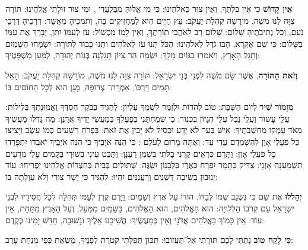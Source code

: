 \textbf{אֵין קָדוֹשׁ}  כִּי אֵין בִּלְתֶּךָ, וְאֵין צוּר כֵּאלֹהֵינוּ: כִּי מִי אֱלוֹהַּ מִבַּלְעֲדֵי \Shem{}, וּמִי צוּר זוּלָתִי אֱלֹהֵינוּ: תּוֹרָה צִוָּה לָנוּ מֹשֶׁה, מוֹרָשָׁה קְהִלַּת יַעֲקֹב: עֵץ חַיִּים הִיא לַמַּחֲזִיקִים בָּהּ, וְתֹמכֶיהָ מְאֻשָּׁר: דְּרָכֶיהָ דַרְכֵי נֹעַם, וְכל נְתִיבֹתֶיהָ שָׁלוֹם: שָׁלוֹם רָב לְאֹהֲבֵי תוֹרָתֶךָ, וְאֵין לָמוֹ מִכְשׁוֹל: \Shem{} עֹז לְעַמּוֹ יִתֵּן, \Shem{} יְבָרֵךְ אֶת עַמּוֹ בַשָּׁלוֹם: כִּי שֵׁם \Shem{} אֶקְרָא, הָבו גֹדֶל לֵאלֹהֵינוּ: הַכֹּל תְּנוּ עֹז לֵאלֹהִים וּתְנוּ כָבוֹד לַתּוֹרָה: יִשְׂמְחוּ הַשָּׁמַיִם וְתָגֵל הָאָרֶץ, וְיֹאמרוּ בַגּוֹיִם \Shem{} מָלָךְ: יִשְׂמַח הַר צִיּוֹן תָּגֵלְנָה בְּנוֹת יְהוּדָה, לְמַעַן מִשְׁפָּטֶיךָ:

\textbf{וְזֹאת הַתּוֹרָה}, אֲשֶׁר שָׂם מֹשֶׁה לִפְנֵי בְּנֵי יִשְׂרָאֵל: תּוֹרָה צִוָּה לָנוּ מֹשֶׁה, מוֹרָשָׁה קְהִלַּת יַעֲקֹב: הָאֵל תָּמִים דַּרְכּוֹ, אִמְרַת־\Shem{} צְרוּפָה, מָגֵן הוּא לְכָל הַחוֹסִים בּוֹ:

\textbf{מִזְמוֹר שִׁיר} לְיוֹם הַשַּׁבָּת: טוֹב לְהֹדוֹת  וּלְזַמֵּר לְשִׁמְךָ עֶלְיוֹן: לְהַגִּיד בַּבֹּקֶר חַסְדֶּךָ וֶאֱמוּנָתְךָ בַּלֵּילוֹת: עֲלֵי עָשׂוֹר וַעֲלֵי נָבֶל עֲלֵי הִגָּיוֹן בְּכִנּוֹר: כִּי שִׂמַּחְתַּנִי \Shem{} בְּפָעֳלֶךָ בְּמַעֲשֵׂי יָדֶיךָ אֲרַנֵּן: מַה גָּדְלוּ מַעֲשֶׂיךָ \Shem{} מְאֹד עָמְקוּ מַחְשְׁבֹתֶיךָ: אִישׁ בַּעַר לֹא יֵדָע וּכְסִיל לֹא יָבִין אֶת זֹאת: בִּפְרֹחַ רְשָׁעִים כְּמוֹ עֵשֶׂב וַיָּצִיצוּ כָּל פֹּעֲלֵי אָוֶן לְהִשָּׁמְדָם עֲדֵי עַד: וְאַתָּה מָרוֹם לְעֹלָם \Shem{}: כִּי הִנֵּה אֹיְבֶיךָ \Shem{} כִּי הִנֵּה אֹיְבֶיךָ יֹאבֵדוּ יִתְפָּרְדוּ כָּל פֹּעֲלֵי אָוֶן: וַתָּרֶם כִּרְאֵים קַרְנִי בַּלֹּתִי בְּשֶׁמֶן רַעֲנָן: וַתַּבֵּט עֵינִי בְּשׁוּרָי בַּקָּמִים עָלַי מְרֵעִים תִּשְׁמַעְנָה אָזְנָי: צַדִּיק כַּתָּמָר יִפְרָח כְּאֶרֶז בַּלְּבָנוֹן יִשְׂגֶּה: שְׁתוּלִים בְּבֵית \Shem{} בְּחַצְרוֹת אֱלֹהֵינוּ יַפְרִיחוּ: עוֹד יְנוּבוּן בְּשֵׂיבָה דְּשֵׁנִים וְרַעֲנַנִּים יִהְיוּ: לְהַגִּיד כִּי יָשָׁר \Shem{} צוּרִי וְלֹא עַוְלָתָה בּוֹ:

\textbf{יְהַללוּ} אֶת שֵׁם \Shem{} כִּי נִשְׂגָּב שְׁמוֹ לְבַדּוֹ, הוֹדוֹ עַל אֶרֶץ וְשָׁמָיִם: וַיָּרֶם קֶרֶן לְעַמּוֹ תְּהִלָּה לְכָל חֲסִידָיו לִבְנֵי יִשְׂרָאֵל עַם קְרֹבוֹ הַלְלוּיָהּ: \Shem{} הוּא הָאֱלֹהִים, \Shem{} הוּא הָאֱלֹהִים, בַּשָּׁמַיִם מִמַּעַל, וְעַל הָאָרֶץ מִתָּחַת, אֵין עוֹד: אֵין כָּמוֹךָ בָאֱלֹהִים אֲדֹנָי וְאֵין כְּמַעֲשֶׂיךָ: הֲשִׁיבֵנוּ \Shem{} אֵלֶיךָ ונָשׁוּבָה, חַדֵּשׁ יָמֵינוּ כְּקֶדֶם:

\textbf{כִּי לֶקַח טוֹב} נָתַתִּי לָכֶם תּוֹרָתִי אַל־תַּעֲזוֹבוּ: תִּכּוֹן תְּפִלָּתִי קטֹרֶת לְפָנֶיךָ, מַשְׂאַת כַּפַּי מִנְחַת עָרֶב:



